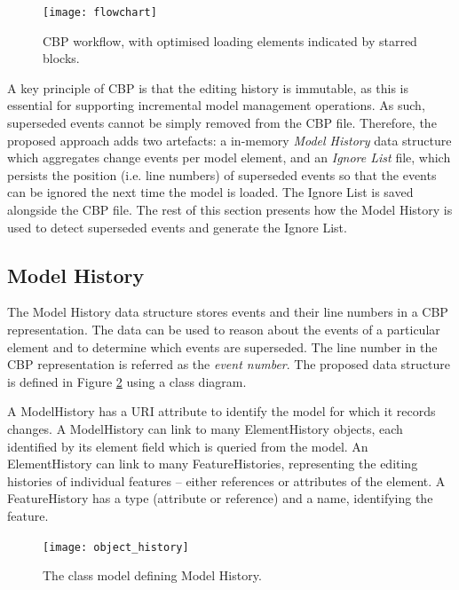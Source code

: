 \begin{figure}[ht]
\centering
\texttt{[image: flowchart]}
\caption{CBP workflow, with optimised loading elements indicated by starred blocks.}
\label{fig:flowchart}
\end{figure}

A key principle of CBP is that the editing history is immutable, as this is essential for supporting incremental model management operations. As such, superseded events cannot be simply removed from the CBP file. Therefore, the proposed approach adds two artefacts: a in-memory \textit{Model History} data structure which aggregates change events per model element, and an \textit{Ignore List} file, which persists the position (i.e. line numbers) of superseded events so that the events can be ignored the next time the model is loaded. The Ignore List is saved alongside the CBP file. The rest of this section presents how the Model History is used to detect superseded events and generate the Ignore List.

\subsection{Model History}
\label{subsec:model_history}
The Model History data structure stores events and their line numbers in a CBP representation.  The data can be used to reason about the events of a particular element and to determine which events are superseded. The line number in the CBP representation is referred as the \textit{event number}. The proposed data structure is defined in Figure \ref{fig:object_history} using a class diagram.  

A \textsf{ModelHistory} has a \textsf{URI} attribute to identify the model for which it records changes.  A \textsf{ModelHistory} can link to many \textsf{ElementHistory} objects, each identified by its \textsf{element} field which is queried from the model. An \textsf{ElementHistory} can link to many \textsf{FeatureHistories}, representing the editing histories of individual features -- either references or attributes of the element. A \textsf{FeatureHistory} has a \textsf{type} (attribute or reference) and a \textsf{name}, identifying the feature.

\begin{figure}[ht]
\centering
\texttt{[image: object\_history]}
\caption{The class model defining Model History.}
\label{fig:object_history}
\end{figure}


